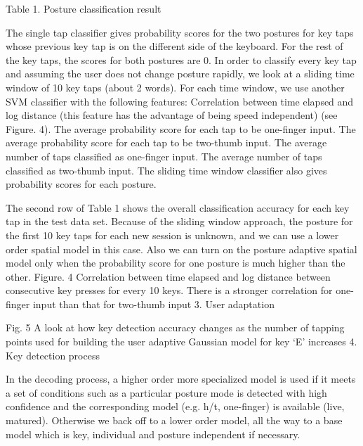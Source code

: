 \documentclass{sigchi}
\begin{document}
Table 1. Posture classification result 

The single tap classifier gives probability scores for the two postures for key taps whose previous key tap is on the different side of the keyboard. For the rest of the key taps, the scores for both postures are 0. In order to classify every key tap and assuming the user does not change posture rapidly, we look at a sliding time window of 10 key taps (about 2 words). For each time window, we use another SVM classifier with the following features:
Correlation between time elapsed and log distance (this feature has the advantage of being speed independent) (see Figure. 4).
The average probability score for each tap to be one-finger input.
The average probability score for each tap to be two-thumb input.
The average number of taps classified as one-finger input.
The average number of taps classified as two-thumb input.
The sliding time window classifier also gives probability scores for each posture.

The second row of Table 1 shows the overall classification accuracy for each key tap in the test data set. Because of the sliding window approach, the posture for the first 10 key taps for each new session is unknown, and we can use a lower order spatial model in this case. Also we can turn on the posture adaptive spatial model only when the probability score for one posture is much higher than the other. 
Figure. 4 Correlation between time elapsed and log distance between consecutive 
key presses for every 10 keys. There is a stronger correlation for one- 
finger input than that for two-thumb input
3. User adaptation

Fig. 5  A look at how key detection accuracy changes as the number of tapping points used for building the user adaptive Gaussian model for key ‘E’ increases
4. Key detection process 

In the decoding process, a higher order more specialized model is used if it meets a set of conditions such as a particular posture mode is detected with high confidence and the corresponding model (e.g. h/t, one-finger) is available (live, matured). Otherwise we back off to a lower order model, all the way to a base model which is key, individual and posture independent if necessary.
\end{document}
